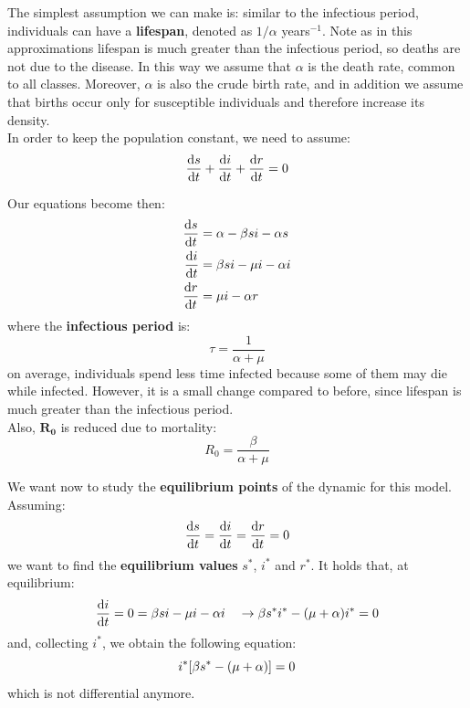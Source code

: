 \documentclass[../main/main.tex]{subfiles}
\begin{document}
The simplest assumption we can make is: similar to the infectious period, individuals can have a \textbf{lifespan}, denoted as \( 1/\alpha  \) years$^{-1}$. Note as in this approximations lifespan is much greater than the infectious period, so deaths are not due to the disease. In this way we assume that \( \alpha  \) is the death rate, common to all classes. Moreover, \( \alpha  \) is also the crude birth rate, and in addition we assume that births occur only for susceptible individuals and therefore increase its density.\\

In order to keep the population constant, we need to assume:
\begin{equation}
  \dv{s}{t} + \dv{i}{t} + \dv{r}{t} = 0
\end{equation}

Our equations become then:
\begin{equation}
\begin{split}
  \dv{s}{t} &= \alpha - \beta s i - \alpha s  \\
  \dv{i}{t} &= \beta s i - \mu i - \alpha i \\
  \dv{r}{t} &= \mu i - \alpha r
\end{split}
\end{equation}
where the \textbf{infectious period} is:
\begin{equation}
  \tau = \frac{1}{\alpha + \mu }
\end{equation}
on average, individuals spend less time infected because some of them may die while infected. However, it is a small change compared to before, since lifespan is much greater than the infectious period.\\

Also, \( \mathbf{R_0} \) is reduced due to mortality:
\begin{equation}
  R_0 = \frac{\beta }{\alpha + \mu }
\end{equation}

We want now to study the \textbf{equilibrium points} of the dynamic for this model. Assuming:
\begin{equation*}
  \dv{s}{t} = \dv{i}{t} = \dv{r}{t} = 0
\end{equation*}
we want to find the \textbf{equilibrium values}  \( s^* \), \( i^* \) and \( r^* \).
It holds that, at equilibrium:
\begin{equation*}
  \dv{i}{t} = 0 = \beta s i - \mu i - \alpha i \quad \rightarrow   \beta s^* i^* - (\mu + \alpha ) i^* = 0
\end{equation*}
and, collecting $i^*$, we obtain the following equation:
\begin{equation}
  i^* \qty[\beta s^* - (\mu + \alpha )] = 0
\end{equation}
which is not differential anymore.\\
\end{document}
